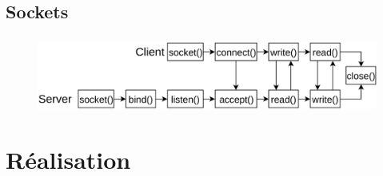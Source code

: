 \documentclass[10pt]{beamer}
\begin{document}
\subsection{Sockets}
\begin{frame}
    \frametitle{\subsecname}
    \begin{center}
        \begin{figure}
            \includegraphics[width=1\textwidth]{images/sockets2.png}
        \end{figure}
    \end{center}
\end{frame}

\section{Réalisation}
\end{document}

